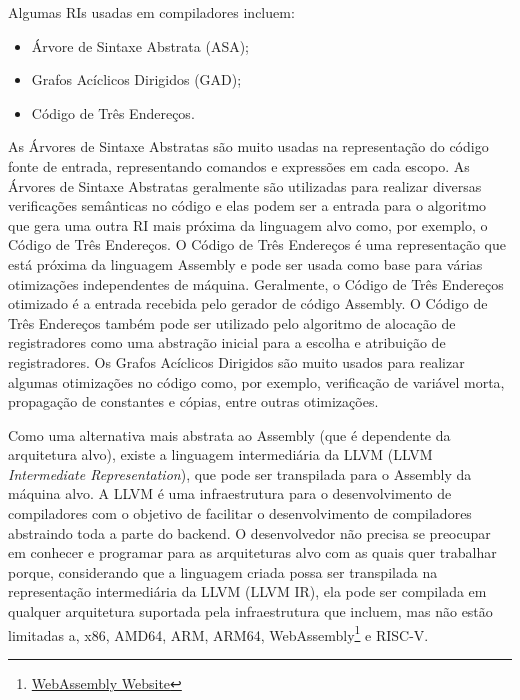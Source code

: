 \documentclass[
	12pt,				%
	openright,			%
	oneside,			%
	a4paper,			%
	main=brazil,
	english,			%
	]{ufsj-abntex2}
\begin{document}
Algumas RIs usadas em compiladores incluem:  
\begin{itemize}
    \item Árvore de Sintaxe Abstrata (ASA); 
    \item Grafos Acíclicos Dirigidos (GAD); 
    \item Código de Três Endereços. 
\end{itemize}

As Árvores de Sintaxe Abstratas são muito usadas na representação do código fonte de entrada, representando comandos e expressões em cada escopo. As Árvores de Sintaxe Abstratas geralmente são utilizadas para realizar diversas verificações semânticas no código e elas podem ser a entrada para o algoritmo que gera uma outra RI mais próxima da linguagem alvo como, por exemplo, o Código de Três Endereços. O Código de Três Endereços é uma representação que está próxima da linguagem Assembly e pode ser usada como base para várias otimizações independentes de máquina. Geralmente, o Código de Três Endereços otimizado é a entrada recebida pelo gerador de código Assembly. O Código de Três Endereços também pode ser utilizado pelo algoritmo de alocação de registradores como uma abstração inicial para a escolha e atribuição de registradores. Os Grafos Acíclicos Dirigidos são muito usados para realizar algumas otimizações no código como, por exemplo, verificação de variável morta, propagação de constantes e cópias, entre outras otimizações. 


Como uma alternativa mais abstrata ao Assembly (que é dependente da arquitetura alvo), existe a linguagem intermediária da LLVM (LLVM \textit{Intermediate Representation}), que pode ser transpilada para o Assembly da máquina alvo. A LLVM é uma infraestrutura para o desenvolvimento de compiladores com o objetivo de facilitar o desenvolvimento de compiladores abstraindo toda a parte do backend. O desenvolvedor não precisa se preocupar em conhecer e programar para as arquiteturas alvo com as quais quer trabalhar porque, considerando que a linguagem criada possa ser transpilada na representação intermediária da LLVM (LLVM IR), ela pode ser compilada em qualquer arquitetura suportada pela infraestrutura que incluem, mas não estão limitadas a, x86, AMD64, ARM, ARM64, WebAssembly\footnote{\href{https://webassembly.org/}{WebAssembly Website}} e RISC-V.
\end{document}
